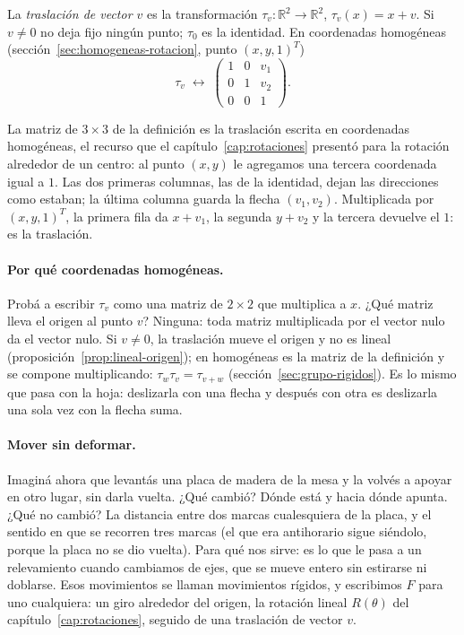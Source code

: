 \begin{definicion}[Traslación]\label{def:traslacion}
La \emph{traslación de vector \(v\)} es la transformación \(\tau_v\colon\mathbb{R}^2\to\mathbb{R}^2\),
\(\tau_v(x)=x+v\). Si \(v\neq0\) no deja fijo ningún punto; \(\tau_0\) es la identidad. En
coordenadas homogéneas (sección~\ref{sec:homogeneas-rotacion}, punto \((x,y,1)^T\))
\[
\tau_v\;\leftrightarrow\;
\begin{pmatrix}1&0&v_1\\0&1&v_2\\0&0&1\end{pmatrix}.
\]
\end{definicion}

La matriz de \(3\times3\) de la definición es la traslación escrita en coordenadas
homogéneas, el recurso que el capítulo~\ref{cap:rotaciones} presentó para la rotación
alrededor de un centro: al punto \((x,y)\) le agregamos una tercera coordenada igual a \(1\).
Las dos primeras columnas, las de la identidad, dejan las direcciones como estaban; la última
columna guarda la flecha \((v_1,v_2)\). Multiplicada por \((x,y,1)^T\), la primera fila da
\(x+v_1\), la segunda \(y+v_2\) y la tercera devuelve el \(1\): es la traslación.

\paragraph{Por qué coordenadas homogéneas.}\label{sec:homogeneas-traslacion}
Probá a escribir \(\tau_v\) como una matriz de \(2\times2\) que multiplica a \(x\). ¿Qué matriz
lleva el origen al punto \(v\)? Ninguna: toda matriz multiplicada por el vector nulo da el
vector nulo.
Si \(v\neq0\), la traslación mueve el origen y no es lineal (proposición~\ref{prop:lineal-origen});
en homogéneas es la matriz de la definición y se compone multiplicando: \(\tau_w\tau_v=\tau_{v+w}\)
(sección~\ref{sec:grupo-rigidos}). Es lo mismo que pasa con la hoja: deslizarla con una flecha
y después con otra es deslizarla una sola vez con la flecha suma.

\paragraph{Mover sin deformar.}
Imaginá ahora que levantás una placa de madera de la mesa y la volvés a apoyar en otro lugar,
sin darla vuelta. ¿Qué cambió? Dónde está y hacia dónde apunta. ¿Qué no cambió? La distancia
entre dos marcas cualesquiera de la placa, y el sentido en que se recorren tres marcas (el que
era antihorario sigue siéndolo, porque la placa no se dio vuelta). Para qué nos sirve: es lo que
le pasa a un relevamiento cuando cambiamos de ejes, que se mueve entero sin estirarse ni
doblarse. Esos movimientos se llaman movimientos rígidos, y escribimos \(F\) para uno
cualquiera: un giro alrededor del origen, la rotación lineal \(R(\theta)\) del
capítulo~\ref{cap:rotaciones}, seguido de una traslación de vector \(v\).

